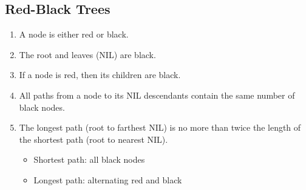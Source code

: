 \subsection*{Red-Black Trees}
\begin{enumerate}
    \item A node is either {\color{red}red} or black.
    \item The root and leaves (NIL) are black.
    \item If a node is {\color{red}red}, then its children are black.
    \item All paths from a node to its NIL descendants contain the same number of black nodes.
    \item The longest path (root to farthest NIL) is no more than twice the length of the shortest path (root to nearest NIL).
        \scriptsize{
        \begin{itemize}
            \item Shortest path: all black nodes
            \item Longest path: alternating {\color{red}red} and black
        \end{itemize}}
\end{enumerate}

